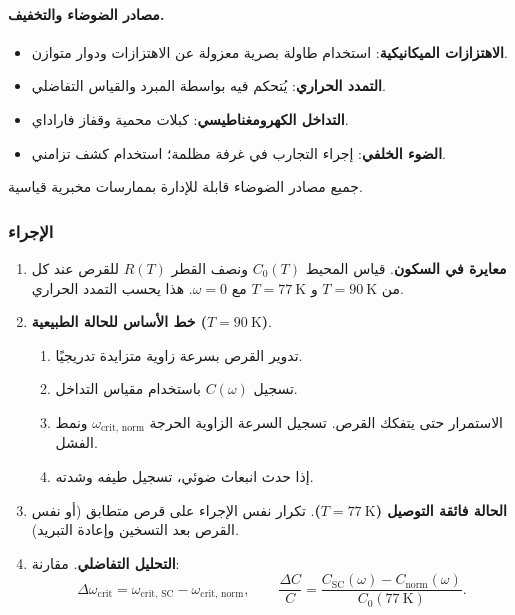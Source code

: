 \documentclass[12pt,a4paper]{article}
\begin{document}
	\paragraph{مصادر الضوضاء والتخفيف.}
	\begin{itemize}
		\item \textbf{الاهتزازات الميكانيكية}: استخدام طاولة بصرية معزولة عن الاهتزازات ودوار متوازن.
		\item \textbf{التمدد الحراري}: يُتحكم فيه بواسطة المبرد والقياس التفاضلي.
		\item \textbf{التداخل الكهرومغناطيسي}: كبلات محمية وقفاز فاراداي.
		\item \textbf{الضوء الخلفي}: إجراء التجارب في غرفة مظلمة؛ استخدام كشف تزامني.
	\end{itemize}
	جميع مصادر الضوضاء قابلة للإدارة بممارسات مخبرية قياسية.
	
	\subsubsection{الإجراء}
	
	\begin{enumerate}
		\item \textbf{معايرة في السكون}. قياس المحيط \(C_0(T)\) ونصف القطر \(R(T)\) للقرص عند كل من \(T = 90\ \text{K}\) و \(T = 77\ \text{K}\) مع \(\omega = 0\). هذا يحسب التمدد الحراري.
		
		\item \textbf{خط الأساس للحالة الطبيعية (\(T = 90\ \text{K}\))}. 
		\begin{enumerate}
			\item تدوير القرص بسرعة زاوية متزايدة تدريجيًا.
			\item تسجيل \(C(\omega)\) باستخدام مقياس التداخل.
			\item الاستمرار حتى يتفكك القرص. تسجيل السرعة الزاوية الحرجة \(\omega_{\text{crit, norm}}\) ونمط الفشل.
			\item إذا حدث انبعاث ضوئي، تسجيل طيفه وشدته.
		\end{enumerate}
		
		\item \textbf{الحالة فائقة التوصيل (\(T = 77\ \text{K}\))}. تكرار نفس الإجراء على قرص متطابق (أو نفس القرص بعد التسخين وإعادة التبريد).
		
		\item \textbf{التحليل التفاضلي}. مقارنة:
		\[
		\Delta \omega_{\text{crit}} = \omega_{\text{crit, SC}} - \omega_{\text{crit, norm}},\qquad
		\frac{\Delta C}{C} = \frac{C_{\text{SC}}(\omega) - C_{\text{norm}}(\omega)}{C_0(77\ \text{K})}.
		\]
	\end{enumerate}
	
\end{document}
